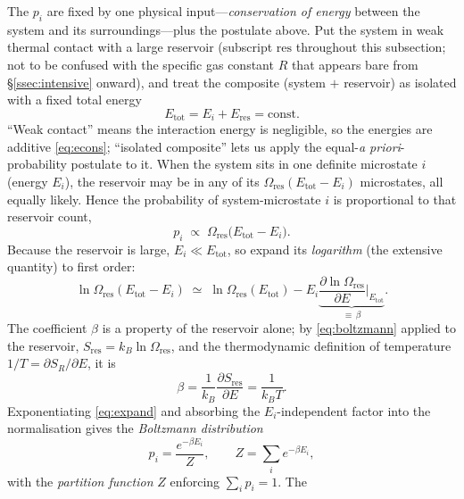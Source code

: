 \documentclass[11pt,a4paper]{article}
\theoremstyle{definition}
\begin{document}
The $p_i$ are fixed by one physical input---\emph{conservation of energy}
between the system and its surroundings---plus the postulate above. Put the
system in weak thermal contact with a large reservoir (subscript $\mathrm{res}$
throughout this subsection; not to be confused with the specific gas constant
$R$ that appears bare from \S\ref{ssec:intensive} onward), and treat the
composite (system $+$ reservoir) as isolated with a fixed total energy
\begin{equation}\label{eq:econs}
E_{\mathrm{tot}}=E_i+E_{\mathrm{res}}=\mathrm{const}.
\end{equation}
``Weak contact'' means the interaction energy is negligible, so the energies are
additive \eqref{eq:econs}; ``isolated composite'' lets us apply the equal-\emph{a
priori}-probability postulate to it. When the system sits in one definite
microstate $i$ (energy $E_i$), the reservoir may be in any of its
$\Omega_{\mathrm{res}}(E_{\mathrm{tot}}-E_i)$ microstates, all equally likely. Hence the
probability of system-microstate $i$ is proportional to that reservoir count,
\begin{equation}\label{eq:pprop}
p_i \;\propto\; \Omega_{\mathrm{res}}\!\big(E_{\mathrm{tot}}-E_i\big).
\end{equation}
Because the reservoir is large, $E_i\ll E_{\mathrm{tot}}$, so expand its
\emph{logarithm} (the extensive quantity) to first order:
\begin{equation}\label{eq:expand}
\ln\Omega_{\mathrm{res}}(E_{\mathrm{tot}}-E_i)
\;\simeq\;\ln\Omega_{\mathrm{res}}(E_{\mathrm{tot}})
-E_i\underbrace{\frac{\partial\ln\Omega_{\mathrm{res}}}{\partial E}\Big|_{E_{\mathrm{tot}}}}_{\displaystyle\equiv\,\beta}.
\end{equation}
The coefficient $\beta$ is a property of the reservoir alone; by
\eqref{eq:boltzmann} applied to the reservoir, $S_{\mathrm{res}}=k_B\ln\Omega_{\mathrm{res}}$, and the
thermodynamic definition of temperature $1/T=\partial S_R/\partial E$, it is
\begin{equation}\label{eq:beta}
\beta=\frac{1}{k_B}\frac{\partial S_{\mathrm{res}}}{\partial E}=\frac{1}{k_BT}.
\end{equation}
Exponentiating \eqref{eq:expand} and absorbing the $E_i$-independent factor into
the normalisation gives the \emph{Boltzmann distribution}
\begin{equation}\label{eq:boltzdist}
p_i=\frac{e^{-\beta E_i}}{Z},\qquad
Z=\sum_i e^{-\beta E_i},
\end{equation}
with the \emph{partition function} $Z$ enforcing $\sum_i p_i=1$. The
\end{document}
